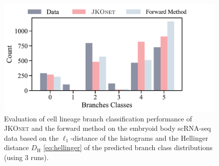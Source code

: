 \begin{figure}[t]
    \includegraphics[width=.49\linewidth]{figures/fig_distribution_cell_types_Branches.pdf}
	\quad
\caption{Evaluation of cell lineage branch classification performance of \textsc{JKOnet} and the forward method on the embryoid body scRNA-seq data based on the $\ell_1$-distance of the histograms and the Hellinger distance $D_{\mathrm{H}}$ \eqref{eq:hellinger} of the predicted branch class distributions (using 3 runs).}
\label{tab:exp_jkonet_cell_class}
\end{figure}

